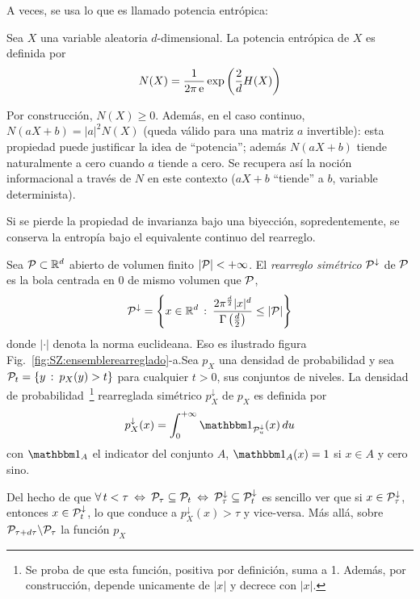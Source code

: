A veces, se usa lo que es llamado potencia entr\'opica:
%
\begin{definicion}
  Sea $X$ una  variable aleatoria $d$-dimensional. La potencia  entr\'opica de $X$
  es definida por
  \[
  N(X) = \frac{1}{2 \pi \e} \exp\left( \frac2d H(X) \right)
  \]
\end{definicion}
%
\noindent Por construcci\'on, $N(X) \ge 0$.  Adem\'as, en el caso continuo, $N(a
X+b)  =  |a|^2 N(X)$  (queda  v\'alido para  una  matriz  $a$ invertible):  esta
propiedad puede justificar  la idea de ``potencia''; adem\'as  $N(a X+b)$ tiende
naturalmente a  cero cuando $a$  tiende a cero.   Se recupera as\'i  la noci\'on
informacional a trav\'es  de $N$ en este  contexto ($a X + b$  ``tiende'' a $b$,
variable determinista).

Si se pierde  la propiedad de invarianza bajo  una biyecci\'on, sopredentemente,
se conserva la entrop\'ia bajo el equivalente continuo del rearreglo.
%
\begin{definicion}
  Sea $\P \subset \Rset^d$ abierto de  volumen finito $|\P| < +\infty$.  El {\it
    rearreglo sim\'etrico}  $\P^\downarrow$ de  $\P$ es la  bola centrada en  0 de
  mismo volumen  que $\P$, \ie
  \[
  \P^\downarrow  = \left\{  x  \in  \Rset^d \,  :  \: \frac{2  \pi^{\frac{d}{2}}
      |x|^d}{\Gamma\left(\frac{d}{2}\right)} \le |\P| \right\}
  \]
  donde  $|\cdot|$  denota  la   norma  euclideana.   Eso  es  ilustrado  figura
  Fig.~\ref{fig:SZ:ensemblerearreglado}-a.\newline  Sea  $p_X$  una densidad  de
  probabilidad y sea $\P_t = \{ y \, : \: p_X(y) > t \}$ para cualquier $t > 0$,
  sus conjuntos  de niveles.  La densidad de  probabilidad~\footnote{Se proba de
    que  esta funci\'on,  positiva por  definici\'on, suma  a 1.   Adem\'as, por
    construcci\'on,  depende   unicamente  de   $|x|$  y  decrece   con  $|x|$.}
  rearreglada sim\'etrico $p^\downarrow_X$ de $p_X$ es definida por
  \[
  p^\downarrow_X(x)  =  \int_0^{+\infty}  \un_{\P_u^\downarrow}(x) \,  du
  \]
  con $\un_A$ el indicator  del conjunto $A$, \ie $\un_A(x) = 1$  si $x \in A$ y
  cero sino.
\end{definicion}
%
Del hecho  de que $\forall \, t  < \tau \: \Leftrightarrow  \: \P_\tau \subseteq
\P_t  \:  \Leftrightarrow \:  \P_\tau^\downarrow  \subseteq \P_t^\downarrow$  es
sencillo   ver   que   si   $x   \in  \P_\tau^\downarrow$,   entonces   $x   \in
\P_t^\downarrow$,  lo que  conduce a  $p_X^\downarrow(x) >  \tau$  y vice-versa.
M\'as  all\'a, sobre  $\P_{\tau+d\tau}  \backslash \P_\tau$  la funci\'on  $p_X$
